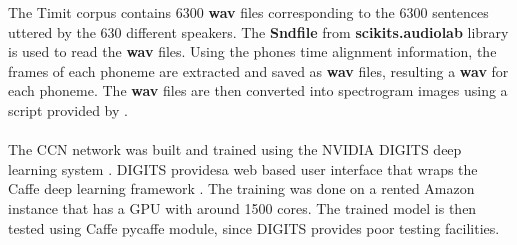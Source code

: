 The Timit corpus contains 6300 \textbf{wav} files corresponding to the 6300 sentences uttered by the 630 different speakers. The \textbf{Sndfile} from \textbf{scikits.audiolab} library is used to read the \textbf{wav} files. Using the phones time alignment information, the frames of each phoneme are extracted and saved as \textbf{wav} files, resulting a \textbf{wav} for each phoneme. The \textbf{wav} files are then converted into spectrogram images using a script provided by \cite{pannous}.\\\\
The CCN network was built and trained using the NVIDIA DIGITS deep learning system \cite{digits}. DIGITS providesa  web based user interface that wraps the Caffe deep learning framework \cite{caffe}. The training was done on a rented Amazon instance that has a GPU with around 1500 cores. The trained model is then tested using Caffe pycaffe module, since DIGITS provides poor testing facilities.